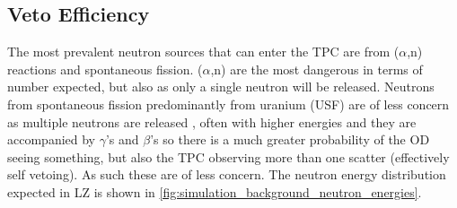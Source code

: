 \subsection{Veto Efficiency}
\label{sec:od_simulation_efficiency}
\par
The most prevalent neutron sources that can enter the TPC are from ($\alpha$,n) reactions and spontaneous fission.
($\alpha$,n) are the most dangerous in terms of number expected, but also as only a single neutron will be released.
Neutrons from spontaneous fission predominantly from uranium (USF) are of less concern as multiple neutrons are released \cite{usf_ref}, often with higher energies and they are accompanied by $\gamma$'s and $\beta$'s so there is a much greater probability of the OD seeing something, but also the TPC observing more than one scatter (effectively self vetoing).
As such these are of less concern.
The neutron energy distribution expected in LZ is shown in \autoref{fig:simulation_background_neutron_energies}.


